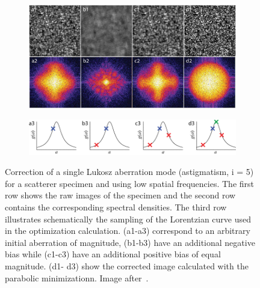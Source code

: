 \begin{figure}[tbh]
			\centering
			\begin{subfigure}[b]{0.8\textwidth}
							\includegraphics[width=\textwidth]{images/wide_parabolic_opti_images}
							\label{fig:para_opt_images}
			\end{subfigure}
			\begin{subfigure}[b]{0.8\textwidth}
							\includegraphics[width=\textwidth]{images/wide_parabolic_opti_graphs}
							\label{fig:para_opt_graphs}
			\end{subfigure}								
			\caption{Correction of a single Lukosz aberration mode (astigmatism, i = 5) for a scatterer specimen and using low spatial frequencies. The first row shows the raw images of the specimen and the second row contains the corresponding spectral densities. The third row illustrates schematically the sampling of the Lorentzian curve used in the optimization calculation. (a1-a3) correspond to an arbitrary initial aberration of magnitude, (b1-b3) have an additional negative bias while (c1-c3) have an additional positive bias of equal magnitude. (d1- d3) show the corrected image calculated with the parabolic minimizationn. Image after~\cite{wide_AOM_loew_freq}.}
	\label{fig:para_opt}
\end{figure} 


